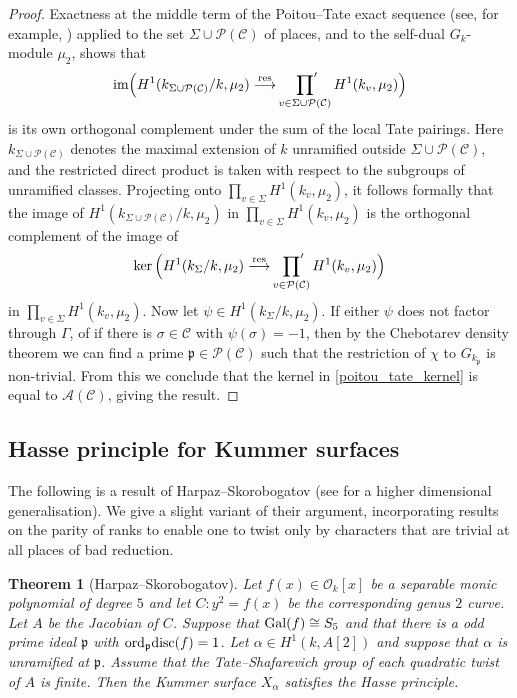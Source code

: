 \documentclass[10pt]{amsart}
\numberwithin{equation}{section}
\newtheorem{theorem}[equation]{Theorem}
\theoremstyle{remark}
\theoremstyle{definition}
\theoremstyle{definition}
\theoremstyle{definition}
\theoremstyle{definition}
\theoremstyle{definition}
\theoremstyle{definition}
\theoremstyle{definition}
\theoremstyle{definition}
\begin{document}
\begin{proof}
Exactness at the middle term of the Poitou--Tate exact sequence (see, for example, \cite[Theorem I.4.10]{MR2261462}) applied to the set $\Sigma \cup  \mathcal{P}(\mathcal{C})$ of places, and to the self-dual $G_k$-module $\mu_2$,  shows that 
\[\text{im}\Big(H^1(k_{\Sigma \cup  \mathcal{P}(\mathcal{C})}/k,\mu_2) \stackrel{\textup{res}}{\longrightarrow}\sideset{}{'}\prod_{v\in \Sigma \cup  \mathcal{P}(\mathcal{C})} H^1(k_v,\mu_2)\Big)\]  is its own  orthogonal complement under the sum of the local Tate pairings. Here $k_{\Sigma \cup  \mathcal{P}(\mathcal{C})}$ denotes the maximal extension of $k$ unramified outside $\Sigma \cup \mathcal{P}(\mathcal{C})$, and the restricted direct product is taken with respect to the subgroups of  unramified classes. Projecting onto $\prod_{v\in \Sigma} H^1(k_v,\mu_2)$, it follows formally that the image of $H^1(k_{\Sigma \cup \mathcal{P}(\mathcal{C})}/k,\mu_2)$  in $\prod_{v\in \Sigma} H^1(k_v,\mu_2)$ is the orthogonal complement  of the image of
\begin{equation} \label{poitou_tate_kernel}
\ker\Big(H^1(k_{\Sigma }/k,  \mu_2)\stackrel{\textup{res}}{\longrightarrow }\sideset{}{'}\prod_{v\in \mathcal{P}(\mathcal{C})}H^1(k_v, \mu_2)\Big)
\end{equation}
 in $\prod_{v\in \Sigma}H^1(k_v,  \mu_2)$. Now let $\psi \in H^1(k_\Sigma/k,\mu_2)$. If either $\psi$ does not factor through $\Gamma$, of if there is $\sigma \in \mathcal{C}$ with $\psi(\sigma)=-1$, then by the Chebotarev density theorem   we can find a prime $\mathfrak{p}\in \mathcal{P}(\mathcal{C})$ such that the restriction of $\chi$ to $G_{k_\mathfrak{p}}$ is non-trivial. From this we conclude that the kernel in  \eqref{poitou_tate_kernel} is equal to $\mathcal{A}(\mathcal{C})$, giving the result. 
\end{proof}

\subsection{Hasse principle for Kummer surfaces}
The following is a result of Harpaz--Skorobogatov \cite[Theorem B]{HS16} (see \cite[Theorem 2.3]{HS16} for a higher dimensional generalisation). We give a slight variant of their argument, incorporating results on the parity of ranks to enable one to twist only by characters that are trivial at all places of bad reduction. 
 
 \begin{theorem}[Harpaz--Skorobogatov] \label{thm:H_S}
Let $f(x)\in \mathcal{O}_k[x]$ be a separable monic polynomial of degree $5$ and let $C:y^2=f(x)$ be the corresponding genus $2$ curve. Let $A$ be the Jacobian of $C$. Suppose that $\textup{Gal}(f)\cong S_{5}$ and that there is a odd prime ideal $\mathfrak{p}$ with $\textup{ord}_{\mathfrak{p}}\textup{disc}(f)=1$. Let $\alpha \in H^1(k,A[2])$ and suppose that $\alpha$ is unramified at $\mathfrak{p}$. Assume that the Tate--Shafarevich group of each quadratic twist of $A$ is finite. Then the Kummer surface $X_\alpha$ satisfies the Hasse principle. 
 \end{theorem}
 
\end{document}
